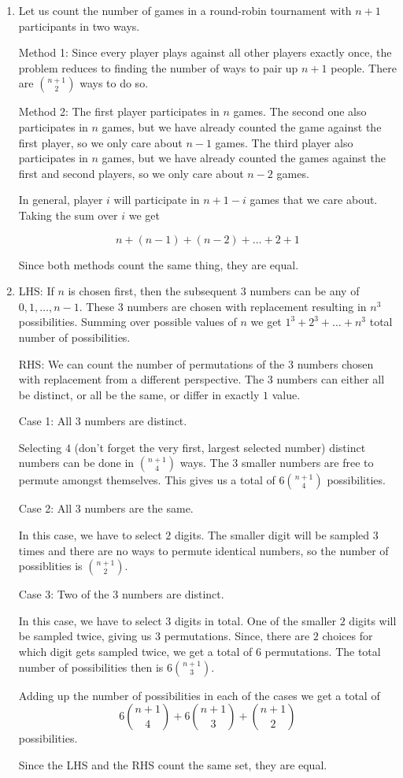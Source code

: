 \begin{enumerate}[label=(\alph*)]
\item   Let us count the number of games in a round-robin tournament with $n+1$ participants in two ways.
  
  Method 1: Since every player plays against all other players exactly once, the problem reduces to finding the number of ways to pair up $n+1$ people. There are ${n+1 \choose 2}$ ways to do so.
  
  Method 2: The first player participates in $n$ games. The second one also participates in $n$ games, but we have already counted the game against the first player, so we only care about $n-1$ games. The third player also participates in $n$ games, but we have already counted the games against the first and second players, so we only care about $n-2$ games. 
  
  In general, player $i$ will participate in $n+1-i$ games that we care about. Taking the sum over $i$ we get
  
  $$n + (n-1) + (n-2) + \dots + 2 + 1$$
  
  Since both methods count the same thing, they are equal.

\item LHS: If $n$ is chosen first, then the subsequent $3$ numbers can be any of $0, 1, \dots, n-1$. These $3$ numbers are chosen with replacement resulting in $n^{3}$ possibilities. Summing over possible values of $n$ we get $1^{3} + 2^{3} + \dots + n^{3}$ total number of possibilities.
  
  RHS: We can count the number of permutations of the $3$ numbers chosen with replacement from a different perspective. The $3$ numbers can either all be distinct, or all be the same, or differ in exactly $1$ value.
  
  Case 1: All $3$ numbers are distinct.
  
  Selecting $4$ (don't forget the very first, largest selected number) distinct numbers can be done in ${n+1 \choose 4}$ ways. The $3$ smaller numbers are free to permute amongst themselves. This gives us a total of $6{n+1 \choose 4}$ possibilities.
  
  Case 2: All $3$ numbers are the same.
  
  In this case, we have to select $2$ digits. The smaller digit will be sampled $3$ times and there are no ways to permute identical numbers, so the number of possiblities is ${n+1 \choose 2}$.
  
  Case 3: Two of the $3$ numbers are distinct.
  
  In this case, we have to select $3$ digits in total. One of the smaller $2$ digits will be sampled twice, giving us $3$ permutations. Since, there are $2$ choices for which digit gets sampled twice, we get a total of $6$ permutations. The total number of possibilities then is $6{n+1 \choose 3}$.
  
  Adding up the number of possibilities in each of the cases we get a total of $$6{n+1 \choose 4} + 6{n+1 \choose 3} + {n+1 \choose 2}$$ possibilities. 
  
  Since the LHS and the RHS count the same set, they are equal.

\end{enumerate}
